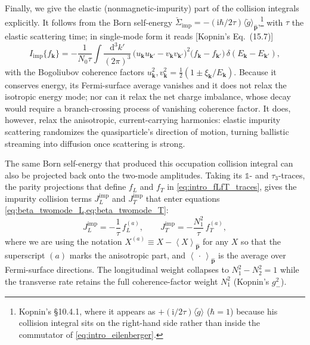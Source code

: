 \documentclass[
  aps,
  prb,
  preprint,
  superscriptaddress,
  longbibliography,
  nofootinbib
]{revtex4-2}
\newcommand{\dd}{\mathrm{d}}
\newcommand{\ii}{\mathrm{i}}
\newcommand{\avg}[1]{\left\langle #1 \right\rangle}
\newcommand{\bk}{\mathbf{k}}
\newcommand{\bp}{\mathbf{p}}
\newcommand{\DOS}{N_1}
\newcommand{\fL}{f_L}
\newcommand{\fT}{f_T}
\providecommand{\openone}{}\renewcommand{\openone}{\mathds{1}}
\begin{document}
Finally, we give the elastic (nonmagnetic-impurity) part of the
collision integrals explicitly. It follows from the Born
self-energy \(\check\Sigma_{\mathrm{imp}}=-(\ii\hbar/2\tau)\langle\check
g\rangle_{\hat{\bp}}\),\footnote{Kopnin's \S10.4.1, where it appears as
\(+(\ii/2\tau)\langle\check g\rangle\) (\(\hbar=1\)) because his
collision integral sits on the right-hand side rather than inside the
commutator of \cref{eq:intro_eilenberger}.} with \(\tau\) the elastic
scattering time; in single-mode form it reads [Kopnin's Eq.~(15.7)]
\begin{equation}
  I_{\mathrm{imp}}\{f_{\bk}\}
  =
  -\frac{1}{N_0\tau}
  \int\!\frac{\dd^3k'}{(2\pi)^3}\,
  \bigl(u_{\bk}u_{\bk'}-v_{\bk}v_{\bk'}\bigr)^{2}
  \bigl(f_{\bk}-f_{\bk'}\bigr)\,
  \delta(E_{\bk}-E_{\bk'}),
  \label{eq:intro_impurity_collision}
\end{equation}
with the Bogoliubov coherence factors
\(u_{\bk}^{2},v_{\bk}^{2}=\tfrac12\!\left(1\pm\xi_{\bk}/E_{\bk}\right)\).
Because it conserves energy, its Fermi-surface average vanishes and it
does not relax the isotropic energy mode; nor can it relax the net
charge imbalance, whose decay would require a branch-crossing process
of vanishing coherence factor. It does, however, relax the
anisotropic, current-carrying harmonics: elastic impurity scattering
randomizes the quasiparticle's direction of motion, turning ballistic
streaming into diffusion once scattering is strong.

The same Born self-energy that produced this occupation collision integral
can also be projected back onto the two-mode amplitudes. Taking its
\(\openone\)- and \(\tau_3\)-traces, the parity projections that define
\(\fL\) and \(\fT\) in \cref{eq:intro_fLfT_traces}, gives the impurity
collision terms \(J_L^{\mathrm{imp}}\) and \(J_T^{\mathrm{imp}}\) that enter equations \cref{eq:beta_twomode_L,eq:beta_twomode_T}:
\begin{equation}
  J_L^{\mathrm{imp}}=-\frac{1}{\tau}\,\fL^{(a)},
  \qquad
  J_T^{\mathrm{imp}}=-\frac{\DOS^{2}}{\tau}\,\fT^{(a)},
  \label{eq:intro_impurity_rates}
\end{equation}
where we are using the notation \(X^{(a)}\equiv X-\avg{X}_{\hat{\bp}}\) for any \(X\) so that the superscript \((a)\) marks the anisotropic part, and
\(\avg{\,\cdot\,}_{\hat{\bp}}\) is the average over Fermi-surface directions.
The longitudinal weight collapses to \(\DOS^{2}-N_2^{2}=1\) while the
transverse rate retains the full coherence-factor weight \(\DOS^{2}\)
(Kopnin's \(g_-^{2}\)).
\end{document}
